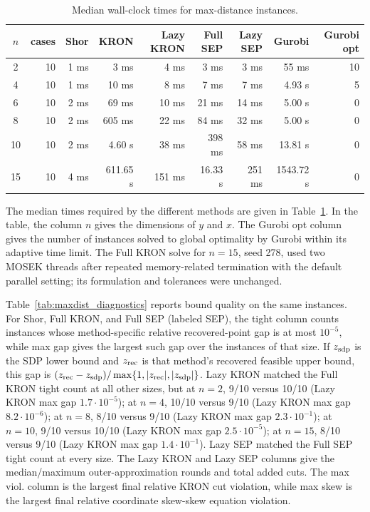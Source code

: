 \documentclass[11pt]{article}
\begin{document}
\begin{table}[htbp]
\centering
\caption{Median wall-clock times for max-distance instances.}
\label{tab:maxdist_times}
\small
\begin{tabular}{c r r r r r r r r}
\hline
$n$ & cases & Shor & KRON & Lazy KRON & Full SEP & Lazy SEP & Gurobi & Gurobi opt \\
\hline
2 & 10 & 1 ms & 3 ms & 4 ms & 3 ms & 3 ms & 55 ms & 10 \\
4 & 10 & 1 ms & 10 ms & 8 ms & 7 ms & 7 ms & 4.93 s & 5 \\
6 & 10 & 2 ms & 69 ms & 10 ms & 21 ms & 14 ms & 5.00 s & 0 \\
8 & 10 & 2 ms & 605 ms & 22 ms & 84 ms & 32 ms & 5.00 s & 0 \\
10 & 10 & 2 ms & 4.60 s & 38 ms & 398 ms & 58 ms & 13.81 s & 0 \\
15 & 10 & 4 ms & 611.65 s & 151 ms & 16.33 s & 251 ms & 1543.72 s & 0 \\
\hline
\hline
\end{tabular}
\end{table}

The median times required by the different methods are given in
Table~\ref{tab:maxdist_times}.  In the table, the column \(n\) gives the
dimensions of \(y\) and \(x\).  The Gurobi opt column gives the
number of instances solved to global optimality by Gurobi within its adaptive
time limit.  The Full KRON solve for \(n=15\), seed 278, used two MOSEK
threads after repeated memory-related termination with the default parallel
setting; its formulation and tolerances were unchanged.

Table~\ref{tab:maxdist_diagnostics} reports bound quality on the same instances.
For Shor, Full KRON, and Full SEP (labeled SEP), the tight column counts instances whose
method-specific relative recovered-point gap is at most \(10^{-5}\), while max
gap gives the largest such gap over the instances of that size.  If
\(z_{\rm sdp}\) is the SDP lower bound and \(z_{\rm rec}\) is that method's
recovered feasible upper bound, this gap is
\((z_{\rm rec}-z_{\rm sdp})/
\max\{1,|z_{\rm rec}|,|z_{\rm sdp}|\}\).  Lazy KRON matched the Full KRON tight count at all other sizes, but at \(n=2\), 9/10 versus 10/10 (Lazy KRON max gap $1.7\cdot 10^{-5}$); at \(n=4\), 10/10 versus 9/10 (Lazy KRON max gap $8.2\cdot 10^{-6}$); at \(n=8\), 8/10 versus 9/10 (Lazy KRON max gap $2.3\cdot 10^{-1}$); at \(n=10\), 9/10 versus 10/10 (Lazy KRON max gap $2.5\cdot 10^{-5}$); at \(n=15\), 8/10 versus 9/10 (Lazy KRON max gap $1.4\cdot 10^{-1}$).  Lazy SEP matched the Full SEP tight count at every size.  The Lazy KRON and Lazy SEP columns give the
median/maximum outer-approximation rounds and total added cuts.  The max viol.
column is the largest final relative KRON cut violation, while max skew is the
largest final relative coordinate skew-skew equation violation.
\end{document}
